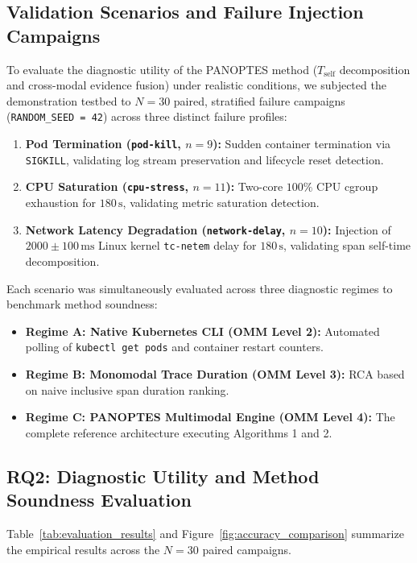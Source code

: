\subsection{Validation Scenarios and Failure Injection Campaigns}
To evaluate the diagnostic utility of the PANOPTES method ($T_{\text{self}}$ decomposition and cross-modal evidence fusion) under realistic conditions, we subjected the demonstration testbed to $N=30$ paired, stratified failure campaigns (\texttt{RANDOM\_SEED = 42}) across three distinct failure profiles:
\begin{enumerate}[leftmargin=1.2em, itemsep=2pt, topsep=3pt]
    \item \textbf{Pod Termination (\texttt{pod-kill}, $n=9$):} Sudden container termination via \texttt{SIGKILL}, validating log stream preservation and lifecycle reset detection.
    \item \textbf{CPU Saturation (\texttt{cpu-stress}, $n=11$):} Two-core $100\%$ CPU cgroup exhaustion for $180\,\text{s}$, validating metric saturation detection.
    \item \textbf{Network Latency Degradation (\texttt{network-delay}, $n=10$):} Injection of $2000 \pm 100\,\text{ms}$ Linux kernel \texttt{tc-netem} delay for $180\,\text{s}$, validating span self-time decomposition.
\end{enumerate}

Each scenario was simultaneously evaluated across three diagnostic regimes to benchmark method soundness:
\begin{itemize}[leftmargin=1.2em, itemsep=2pt, topsep=3pt]
    \item \textbf{Regime A: Native Kubernetes CLI (OMM Level 2):} Automated polling of \texttt{kubectl get pods} and container restart counters.
    \item \textbf{Regime B: Monomodal Trace Duration (OMM Level 3):} RCA based on naive inclusive span duration ranking.
    \item \textbf{Regime C: PANOPTES Multimodal Engine (OMM Level 4):} The complete reference architecture executing Algorithms 1 and 2.
\end{itemize}

\subsection{RQ2: Diagnostic Utility and Method Soundness Evaluation}
Table~\ref{tab:evaluation_results} and Figure~\ref{fig:accuracy_comparison} summarize the empirical results across the $N=30$ paired campaigns.

